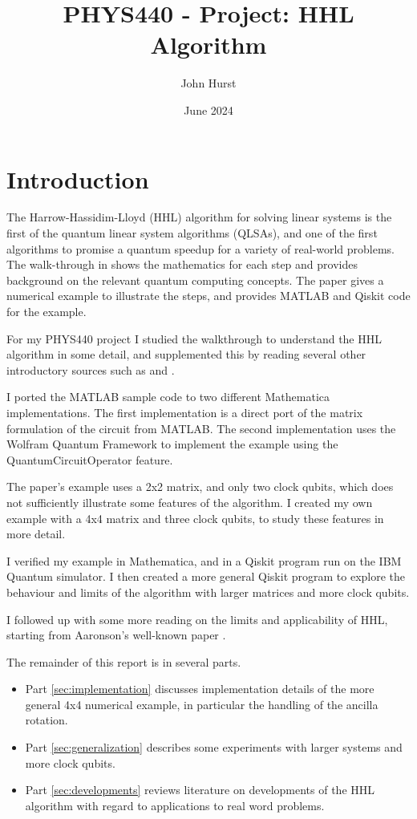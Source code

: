 \documentclass[12pt]{extarticle}
\title{PHYS440 - Project: HHL Algorithm}
\author{John Hurst}
\date{June 2024}
\begin{document}
\maketitle

\tableofcontents

\newpage

\section{Introduction}

The Harrow-Hassidim-Lloyd (HHL) algorithm for solving linear systems\cite{hhl2009} is
the first of the quantum linear system algorithms (QLSAs),
and one of the first algorithms to promise a quantum speedup for a variety of real-world problems.
The walk-through in \cite{zaman2023step} shows the mathematics for each step and provides background on the relevant quantum computing concepts.
The paper gives a numerical example to illustrate the steps, and provides MATLAB and Qiskit code for the example.

For my PHYS440 project I studied the walkthrough to understand the HHL algorithm in some detail,
and supplemented this by reading several other introductory sources such as \cite{baaquie2023} and \cite{hidary2021}.

I ported the MATLAB sample code to two different Mathematica implementations.
The first implementation is a direct port of the matrix formulation of the circuit from MATLAB.
The second implementation uses the Wolfram Quantum Framework to implement the example using the QuantumCircuitOperator feature.

The paper's example uses a 2x2 matrix, and only two clock qubits, which does not sufficiently illustrate some features of the algorithm.
I created my own example with a 4x4 matrix and three clock qubits, to study these features in more detail.

I verified my example in Mathematica, and in a Qiskit program run on the IBM Quantum simulator.
I then created a more general Qiskit program to explore the behaviour and limits of the algorithm with larger matrices and more clock qubits.

I followed up with some more reading on the limits and applicability of HHL, starting from Aaronson's well-known paper \cite{aaronson2015read}.

The remainder of this report is in several parts.
\begin{itemize}
\item Part \ref{sec:implementation} discusses implementation details of the more general 4x4 numerical example, in particular the handling of the ancilla rotation.
\item Part \ref{sec:generalization} describes some experiments with larger systems and more clock qubits.
\item Part \ref{sec:developments} reviews literature on developments of the HHL algorithm with regard to applications to real word problems.
\end{itemize}
\end{document}
